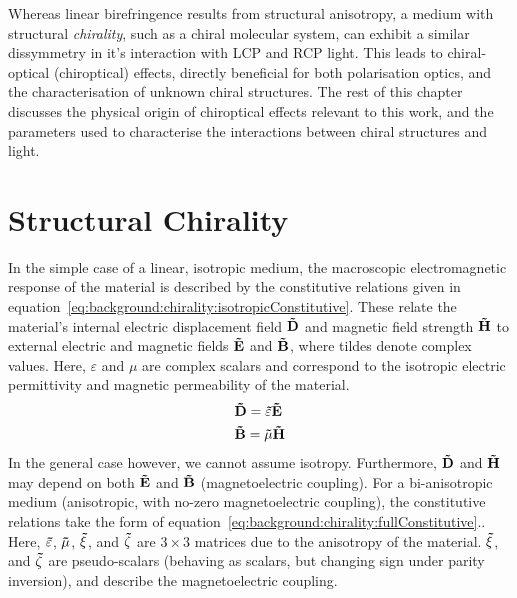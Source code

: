 Whereas linear birefringence results from structural anisotropy, a medium with structural \textit{chirality}, such as a chiral molecular system, can exhibit a similar dissymmetry in it's interaction with LCP and RCP light. This leads to chiral-optical (chiroptical) effects, directly beneficial for both polarisation optics, and the characterisation of unknown chiral structures. The rest of this chapter discusses the physical origin of chiroptical effects relevant to this work, and the parameters used to characterise the interactions between chiral structures and light.


\section{Structural Chirality}\label{sec:background:Chirality:Structural}
In the simple case of a linear, isotropic medium, the macroscopic electromagnetic response of the material is described by the constitutive relations given in equation~\ref{eq:background:chirality:isotropicConstitutive}. These relate the material's internal electric displacement field $\bf{\tilde D}$ and magnetic field strength $\bf{\tilde H}$ to external electric and magnetic fields $\bf{\tilde E}$ and $\bf{\tilde B}$, where tildes denote complex values. Here, $\varepsilon$ and $\mu$ are complex scalars and correspond to the isotropic electric permittivity and magnetic permeability of the material.
\begin{equation}\label{eq:background:chirality:isotropicConstitutive}
	\begin{split}
        & \bf{\tilde D} = \tilde \varepsilon \bf{\tilde E} \\
        & \bf{\tilde B} = \tilde \mu \bf{\tilde H}
	\end{split}
\end{equation}
In the general case however, we cannot assume isotropy. Furthermore, $\bf{\tilde D}$ and $\bf{\tilde H}$ may depend on both $\bf{\tilde E}$ and $\bf{\tilde B}$ (magnetoelectric coupling). For a bi-anisotropic medium (anisotropic, with no-zero magnetoelectric coupling), the constitutive relations take the form of equation~\ref{eq:background:chirality:fullConstitutive}.\cite{Ishimaru2003, Capolino2009}. Here, $\bf{\tilde \varepsilon}$, $\bf{\tilde \mu}$, $\bf{\tilde \xi}$, and $\bf{\tilde \zeta}$ are $3 \times 3$ matrices due to the anisotropy of the material. $\bf{\tilde \xi}$, and $\bf{\tilde \zeta}$ are pseudo-scalars (behaving as scalars, but changing sign under parity inversion), and describe the magnetoelectric coupling.
